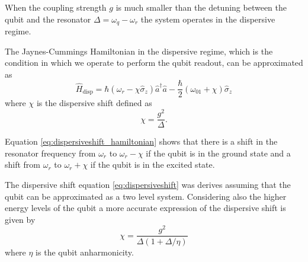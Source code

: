 When the coupling strength $g$ is much smaller than the detuning between the qubit and the resonator $\Delta = \omega_q -\omega_r $ the system operates in the dispersive regime.

The Jaynes-Cummings Hamiltonian in the dispersive regime, which is the condition in which we operate to perform the qubit readout, can be approximated as 
\begin{equation}\label{eq:dispersiveshift_hamiltonian}
    \hat{H}_{\text{disp}} = \hbar (\omega_r - \chi \hat{\sigma}_z) \hat{a}^\dagger \hat{a} - \frac{\hbar}{2} (\omega_{01} + \chi) \hat{\sigma}_z
\end{equation}
where $\chi$ is the dispersive shift defined as \begin{equation}\label{eq:dispersiveshift}
    \chi = \frac{g^2}{\Delta}.
\end{equation}

Equation \ref{eq:dispersiveshift_hamiltonian} shows that there is a shift in the resonator frequency from $\omega_r$ to $\omega_r - \chi$ if the qubit is in the ground state and a shift from $\omega_r$ to $\omega_r + \chi$ if the qubit is in the excited state.

The dispersive shift equation \ref{eq:dispersiveshift} was derives assuming that the qubit can be approximated as a two level system.
Considering also the higher energy levels of the qubit a more accurate expression of the dispersive shift is given by 
\begin{equation}
    \chi = \frac{g^2}{\Delta(1+\Delta/\eta)}
\end{equation} 
where $\eta$ is the qubit anharmonicity.

